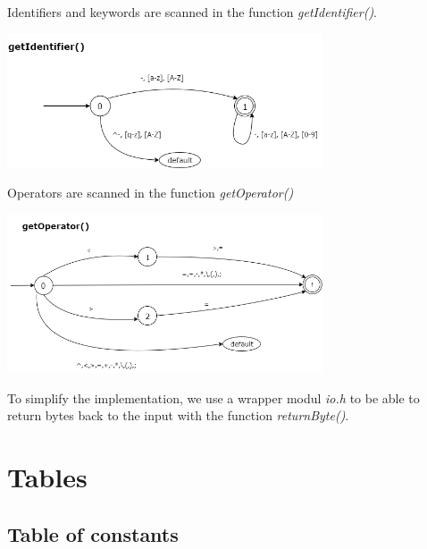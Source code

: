 \documentclass[10pt,a4paper,titlepage]{article}
\begin{document}
\begin{justify}
Identifiers and keywords are scanned in the function \textit{getIdentifier()}.
\end{justify}
\begin{center}
  \includegraphics[width=0.7\textwidth]{img/getIdentifier.png}
\end{center}

\begin{justify}
Operators are scanned in the function \textit{getOperator()}
\end{justify}
\begin{center}
  \includegraphics[width=0.7\textwidth]{img/getOperator.png}
\end{center}

\begin{justify}

To simplify the implementation, we use a wrapper modul \textit{io.h} to
be able to return bytes back to the input with the function \textit{returnByte()}.
\end{justify}

\newpage
\section{Tables}
\subsection{Table of constants}
\end{document}
